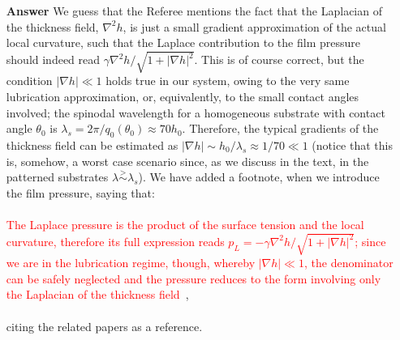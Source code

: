 \documentclass[12pt,english]{article}
\begin{document}
\begin{itemize}
\item[ \textbf{{Answer}}]
{
We guess that the Referee mentions the fact that the Laplacian of the thickness field, $\nabla^2 h$,
is just a small gradient approximation of the actual local curvature, such that the Laplace contribution to the film pressure should indeed read $\gamma \nabla^2 h/\sqrt{1+|\nabla h|^2}$. This is of course correct, but 
the condition $|\nabla h| \ll 1$ holds true in our system, owing to the very same lubrication approximation,
or, equivalently, to the small contact angles involved; the spinodal wavelength for a homogeneous substrate with
contact angle $\theta_0$ is $\lambda_s = 2\pi/q_0(\theta_0) \approx 70 h_0$. Therefore, the typical gradients
of the thickness field can be estimated as $|\nabla h| \sim h_0/\lambda_s \approx 1/70 \ll 1$ (notice 
that this is, somehow, a worst case scenario since, as we discuss in the text, in the patterned substrates
$\lambda \stackrel{>}{\sim} \lambda_s$).
We have added a footnote, when we introduce the film pressure, saying that:\\
\\
\textcolor{red}{The Laplace pressure is the product of the surface tension 
and the local curvature, therefore its full expression reads $p_L = -\gamma \nabla^2 h/\sqrt{1+|\nabla h|^2}$; 
since we are in the lubrication regime, though, whereby $|\nabla h| \ll 1$, the denominator can be safely neglected 
and the pressure reduces to the form involving only the Laplacian of the thickness field~\cite{Benet2014,alizadeh_pahlavan_cueto-felgueroso_hosoi_mckinley_juanes_2018}}, \\
\\
citing the related papers as a reference.
}
\end{itemize}




\end{document}
